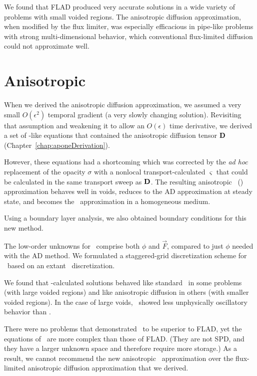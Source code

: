 We found that FLAD produced very accurate solutions in a wide
variety of problems with small voided regions. The anisotropic diffusion
approximation, when modified by the flux limiter, was especially efficacious in
pipe-like problems with strong multi-dimensional behavior, which conventional
flux-limited diffusion could not approximate well.

\section{Anisotropic \texorpdfstring{\Pone}{P1}}

When we derived the anisotropic diffusion approximation, we assumed a very small
$O(\epsilon^2)$ temporal gradient (a very slowly changing solution). Revisiting
that assumption and weakening it to allow an $O(\epsilon)$ time derivative, we
derived a set of \Pone-like equations that contained the anisotropic diffusion
tensor $\mathbf{D}$ (Chapter~\ref{chap:aponeDerivation}). 

However, these equations
had a shortcoming which was corrected by the \emph{ad hoc} replacement of the
opacity $\sigma$ with a nonlocal transport-calculated $\varsigma$ that could be
calculated in the same transport sweep as $\mathbf{D}$. The resulting anisotropic
\Pone\ (\APone) approximation behaves well in voids, reduces to the AD
approximation at steady state, and becomes the \Pone\ approximation in a
homogeneous medium.

Using a boundary layer analysis, we also obtained boundary conditions for this
new method.

The low-order unknowns for \APone\ comprise both $\phi$ and $\vec{F}$, compared
to just $\phi$ needed with the AD method.  We formulated a staggered-grid
discretization scheme for \APone\ based on an extant \Pone\ discretization.

We found that \APone-calculated solutions behaved like standard \Pone\ in some
problems (with large voided regions) and like anisotropic diffusion in others
(with smaller voided regions). In the case of large voids, \APone\ showed less
unphysically oscillatory behavior than \Pone.

There were no problems that demonstrated \APone\ to be superior to FLAD,
yet the equations of \APone\ are more complex than those of FLAD. (They are not
SPD, and they have a larger unknown space and therefore require more storage.)
As a result, we cannot recommend the new anisotropic \Pone\ approximation over
the flux-limited anisotropic diffusion approximation that we derived.

